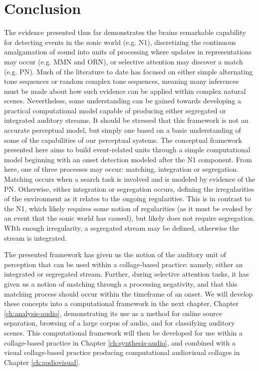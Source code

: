 \documentclass[a4paper,10pt,final]{ThesisStyle}
\begin{document}

\section{Conclusion}

The evidence presented thus far demonstrates the brains remarkable capability for detecting events in the sonic world (e.g. N1), discretizing the continuous amalgamation of sound into units of processing where updates in representations may occur (e.g. MMN and ORN), or selective attention may discover a match (e.g. PN).  Much of the literature to date has focused on either simple alternating tone sequences or random complex tone sequences, meaning many inferences must be made about how such evidence can be applied within complex natural scenes.  Nevertheless, some understanding can be gained towards developing a practical computational model capable of producing either segregated or integrated auditory streams.  It should be stressed that this framework is not an accurate perceptual model, but simply one based on a basic understanding of some of the capabilities of our perceptual systems.  The conceptual framework presented here aims to build event-related units through a simple computational model beginning with an onset detection modeled after the N1 component.  From here, one of three processes may occur: matching, integration or segregation.  Matching occurs when a search task is involved and is modeled by evidence of the PN.  Otherwise, either integration or segregation occurs, defining the irregularities of the environment as it relates to the ongoing regularities.  This is in contrast to the N1, which likely requires some notion of regularities (as it must be evoked by an event that the sonic world has caused), but likely does not require segregation. WIth enough irregularity, a segregated stream may be defined, otherwise the stream is integrated.  

The presented framework has given us the notion of the auditory unit of perception that can be used within a collage-based practice: namely, either an integrated or segregated stream.  Further, during selective attention tasks, it has given us a notion of matching through a processing negativity, and that this matching process should occur within the timeframe of an onset.  We will develop these concepts into a computational framework in the next chapter, Chapter \ref{ch:analysis-audio}, demonstrating its use as a method for online source separation, browsing of a large corpus of audio, and for classifying auditory scenes.  This computational framework will then be developed for use within a collage-based practice in Chapter \ref{ch:synthesis-audio}, and combined with a visual collage-based practice producing computational audiovisual collages in Chapter \ref{ch:audiovisual}.
\end{document}

